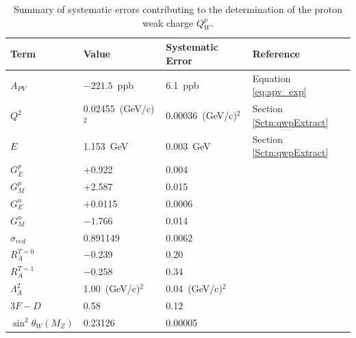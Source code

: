 \begin{table}[h]
\centering
\caption{\label{tab:Qw_syst_err}Summary of systematic errors contributing to the determination of the proton weak charge $Q_W^p$.}
\begin{tabular}{l|l|l|l}\hline
Term&Value&Systematic Error&Reference\\\hline\hline
$A_{PV}$&$-221.5$~ppb&6.1~ppb&Equation \ref{eq:apv_exp}\\
$Q^2$&0.02455~(GeV/c)$^2$&0.00036~(GeV/c)$^2$&Section \ref{Sctn:qwpExtract}\\
$E$&1.153~GeV&0.003~GeV&Section \ref{Sctn:qwpExtract}\\
$G_E^p$& +0.922 & 0.004&\cite{ArringtonSick}\\
$G_M^p$& +2.587 & 0.015&\cite{ArringtonSick}\\
$G_E^n$& +0.0115& 0.0006&\cite{ArringtonSick}\\
$G_M^n$& $-1.766$ & 0.014&\cite{ArringtonSick}\\
$\sigma_{red}$&0.891149&0.0062&\cite{ArringtonSick}\\
$R_A^{T=0}$&$-0.239$&0.20&\cite{Lui2007}\\
$R_A^{T=1}$&$-0.258$&0.34&\cite{Lui2007}\\
$\Lambda_A^2$&1.00~(GeV/c)$^2$&0.04~(GeV/c)$^2$&\cite{Lui2007}\\
$3F-D$&0.58&0.12&\cite{Lui2007}\\
$\sin^2\theta_W(M_Z)$&0.23126&0.00005&\cite{PDG2014}\\\hline
\end{tabular}
\end{table}

